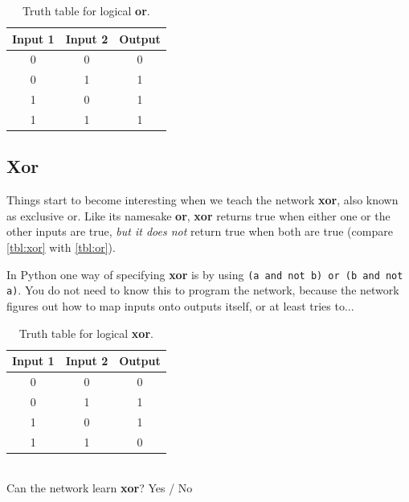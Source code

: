 \documentclass[a4paper,10pt]{article}
\begin{document}
\begin{table}[ht]
 \centering
 \begin{tabular}[t]{ccc}
Input 1 & Input 2 & Output\\ \hline
0 & 0 & 0\\
0 & 1 & 1 \\
1 & 0 & 1 \\
1 & 1 & 1 \\

\end{tabular} \caption{Truth table for logical \textbf{or}.}
 \label{tbl:or}
\end{table}

\subsection{Xor}
Things start to become interesting when we teach the network \textbf{xor}, also known as exclusive or. Like its namesake \textbf{or}, \textbf{xor} returns true when either one or the other inputs are true, \emph{but it does not} return true when both are true (compare \autoref{tbl:xor} with \autoref{tbl:or}).  


In Python one way of specifying \textbf{xor} is by using \texttt{(a and not b) or (b and not a)}. You do not need to know this to program the network, because the network figures out how to map inputs onto outputs itself, or at least tries to...

\begin{table}[ht]
 \centering
 \begin{tabular}[t]{ccc}
Input 1 & Input 2 & Output\\ \hline
0 & 0 & 0\\
0 & 1 & 1 \\
1 & 0 & 1 \\
1 & 1 & 0 \\

\end{tabular} \caption{Truth table for logical \textbf{xor}.}
 \label{tbl:xor}
\end{table}


\ \\ Can the network learn \textbf{xor}?    Yes / No   
\ \\
\end{document}
